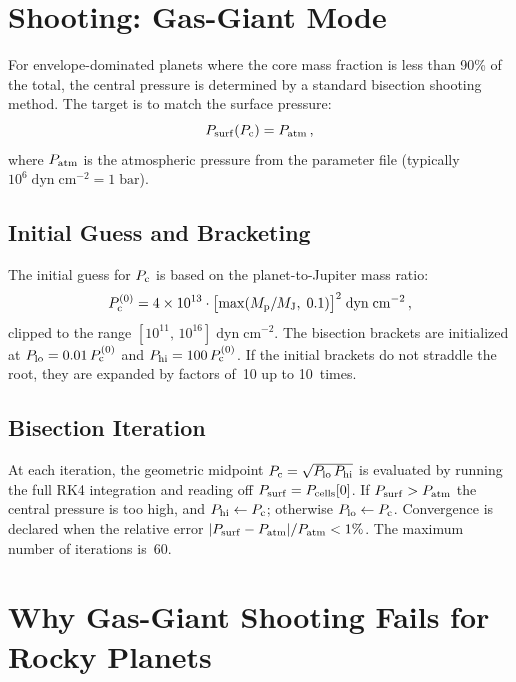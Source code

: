 \documentclass{aastex631}
\newcommand{\Pc}{P_{\rm c}}
\newcommand{\Patm}{P_{\rm atm}}
\newcommand{\Psurf}{P_{\rm surf}}
\begin{document}
\section{Shooting: Gas-Giant Mode}\label{sec:shooting_gasgiant}

For envelope-dominated planets where the core mass fraction is less than
90\% of the total, the central pressure is determined by a standard
bisection shooting method.  The target is to match the surface pressure:
\begin{equation}\label{eq:shooting_target}
  P_{\rm surf}(\Pc) = \Patm\,,
\end{equation}
where $\Patm$ is the atmospheric pressure from the parameter file
(typically $10^6\;\mathrm{dyn\;cm^{-2}} = 1\;\mathrm{bar}$).

\subsection{Initial Guess and Bracketing}

The initial guess for $\Pc$ is based on the planet-to-Jupiter mass ratio:
\begin{equation}\label{eq:Pc_guess}
  \Pc^{(0)} = 4 \times 10^{13}
    \cdot\bigl[\max(M_{\rm p}/M_{\rm J},\;0.1)\bigr]^{2}
    \;\mathrm{dyn\;cm^{-2}}\,,
\end{equation}
clipped to the range $[10^{11},\,10^{16}]\;\mathrm{dyn\;cm^{-2}}$.
The bisection brackets are initialized at $P_{\rm lo} = 0.01\,\Pc^{(0)}$
and $P_{\rm hi} = 100\,\Pc^{(0)}$.  If the initial brackets do not
straddle the root, they are expanded by factors of~10 up to 10~times.

\subsection{Bisection Iteration}

At each iteration, the geometric midpoint $\Pc = \sqrt{P_{\rm lo}\,
P_{\rm hi}}$ is evaluated by running the full RK4 integration and
reading off $\Psurf = P_{\rm cells}[0]$.  If $\Psurf > \Patm$ the
central pressure is too high, and $P_{\rm hi} \gets \Pc$; otherwise
$P_{\rm lo} \gets \Pc$.  Convergence is declared when the relative error
$|\Psurf - \Patm|/\Patm < 1\%$.  The maximum number of iterations
is~60.

\section{Why Gas-Giant Shooting Fails for Rocky
  Planets}\label{sec:why_rocky_fails}
\end{document}
